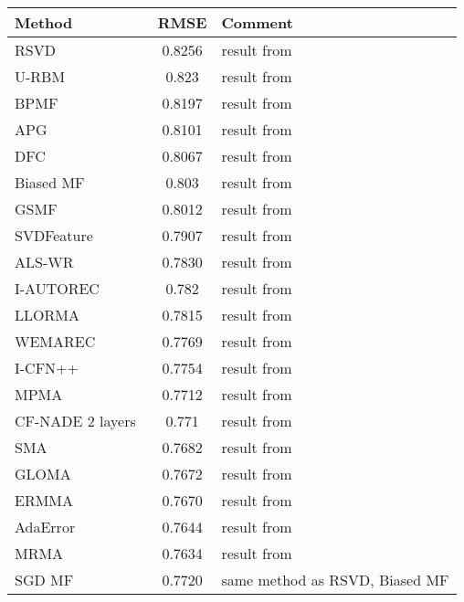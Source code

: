 \documentclass{article}
\newcommand\rmseurbm{0.823}
\newcommand\rmsersvd{0.8256}
\newcommand\rmsebpmf{0.8197}
\newcommand\rmsebiasmf{0.803}
\newcommand\rmsesvdfeature{0.7907}
\newcommand\rmsealswr{0.7830}
\newcommand\rmseapg{0.8101}
\newcommand\rmsedfc{0.8067}
\newcommand\rmsegsmf{0.8012}
\newcommand\rmseiautorec{0.782}
\newcommand\rmsellorma{0.7815}
\newcommand\rmsewemarec{0.7769}
\newcommand\rmseicfnpp{0.7754}
\newcommand\rmsenade{0.771}
\newcommand\rmsempma{0.7712}
\newcommand\rmsesma{0.7682}
\newcommand\rmsegloma{0.7672}
\newcommand\rmseermma{0.7670}
\newcommand\rmseadaerror{0.7644}
\newcommand\rmsemrma{0.7634}
\newcommand\rmsefmui{0.7720}
\begin{document}
\begin{table}[h]
\centering
\begin{tabular}{lSl}
\toprule
Method & {RMSE} & Comment \\
\midrule
RSVD~\cite{paterek:kddcup07} & \rmsersvd & result from \cite{li:icml16}\\
U-RBM~\cite{salakhutdinov:icml07} & \rmseurbm & result from \cite{sedhain:www15} \\
BPMF~\cite{salakhutdinov:icml08} & \rmsebpmf & result from \cite{li:icml16}\\
APG~\cite{toh:pjo10} & \rmseapg & result from \cite{li:icml16}\\
DFC~\cite{mackey:nips11} & \rmsedfc & result from \cite{li:icml16} \\
Biased MF~\cite{koren:ieee09} & \rmsebiasmf & result from \cite{sedhain:www15}\\
GSMF~\cite{yuan:aaai14} & \rmsegsmf & result from \cite{li:icml16}\\
SVDFeature~\cite{chen:jmlr12} & \rmsesvdfeature & result from \cite{strub:arxiv16} \\ 
ALS-WR~\cite{zhou:aaim08} & \rmsealswr & result from \cite{strub:arxiv16} \\
\midrule
I-AUTOREC~\cite{sedhain:www15} & \rmseiautorec &  result from \cite{sedhain:www15} \\
LLORMA~\cite{lee:icml13} & \rmsellorma & result from \cite{lee:icml13} \\
WEMAREC~\cite{chen:sigir15} & \rmsewemarec & result from \cite{chen:sigir15}\\
I-CFN++~\cite{strub:arxiv16} & \rmseicfnpp & result from \cite{strub:arxiv16} \\ 
MPMA~\cite{chen:ijcai16} & \rmsempma & result from \cite{chen:ijcai16} \\
CF-NADE 2 layers~ \cite{zheng:icml16} & \rmsenade & result from \cite{zheng:icml16} \\
SMA~\cite{li:icml16} & \rmsesma & result from \cite{li:icml16}\\
GLOMA~\cite{chen:aaai17} & \rmsegloma & result from \cite{chen:aaai17} \\
ERMMA~\cite{li:aaai17} & \rmseermma & result from \cite{li:aaai17} \\
AdaError~\cite{li:www18} & \rmseadaerror & result from \cite{li:www18} \\
MRMA~\cite{li:nips17} & \rmsemrma & result from \cite{li:nips17} \\
\midrule
SGD MF~\cite{paterek:kddcup07,koren:ieee09} & \rmsefmui & same method as RSVD, Biased MF \\

\end{tabular}
\end{table}
\end{document}
